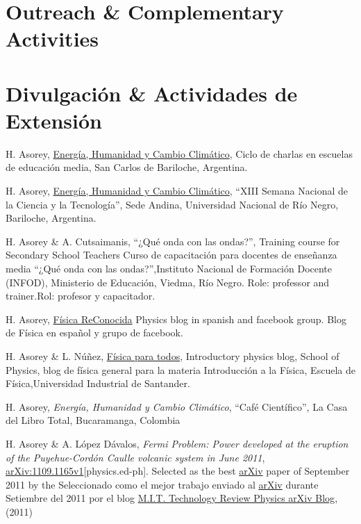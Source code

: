 \ifeng
\section*{Outreach \& Complementary Activities}
\else
\section*{Divulgación \& Actividades de Extensión}
\fi
\noindent

H. Asorey, \href{}{Energía, Humanidad y Cambio Climático}, Ciclo de charlas en escuelas de educación media, San Carlos de Bariloche, Argentina.

H. Asorey, \href{http://www.semanadelaciencia.mincyt.gob.ar/}{Energía, Humanidad y Cambio Climático}, ``XIII Semana Nacional de la Ciencia y la Tecnología'', Sede Andina, Universidad Nacional de Río Negro, Bariloche, Argentina.

H. Asorey \& A. Cutsaimanis, \ifeng ``¿Qué onda con las ondas?'', Training course for Secondary School Teachers \else Curso de capacitación para docentes de enseñanza media ``¿Qué onda con las ondas?'',\fi Instituto Nacional de Formación Docente (INFOD), Ministerio de Educación, Viedma, Río Negro. \ifeng Role: professor and trainer.\else Rol: profesor y capacitador.\fi

H. Asorey, \href{http://fisicareconocida.blogspot.com}{Física ReConocida} \ifeng Physics blog in spanish and facebook group. \else Blog de Física en español y grupo de facebook.\fi 

 H. Asorey \& L. Núñez, \href{http://halley.uis.edu.co/fisica_para_todos}{Física para todos}, \ifeng Introductory physics blog, School of Physics, \else blog de física general para la materia Introducción a la Física, Escuela de Física,\fi Universidad Industrial de Santander. 

H. Asorey, {\it{Energía, Humanidad y Cambio Climático}}, ``Café Científico'', La Casa del Libro Total, Bucaramanga, Colombia

H. Asorey \& A. López Dávalos, {\emph{Fermi Problem: Power
developed at the eruption of the Puyehue-Cordón Caulle volcanic system in June
2011}}, \href{http://arxiv.org/abs/1109.1165}{arXiv:1109.1165v1}[physics.ed-ph]. \ifeng
Selected as the best \href{http://arxiv.org}{arXiv} paper of September 2011 by the
\else
Seleccionado como el mejor trabajo enviado al \href{http://arxiv.org}{arXiv} durante Setiembre del 2011 por el blog
\fi
\href{http://www.technologyreview.com/blog/arxiv/27140/}{M.I.T. Technology
Review Physics arXiv Blog}, (2011)

